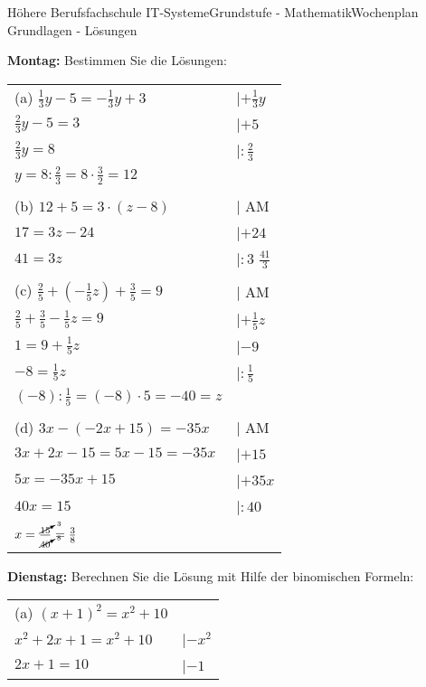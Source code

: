 \documentclass[oneside,openany,headings=optiontotoc,11pt,numbers=noenddot]{scrreprt}
\begin{document}
	\begin{worksheet}{Höhere Berufsfachschule IT-Systeme}{Grundstufe - Mathematik}{Wochenplan Grundlagen - Lösungen}
		\noindent
		\begin{framed}
			\noindent
			\textbf{Montag:} Bestimmen Sie die Lösungen:\\
			\begin{tabularx}{\textwidth}{ll}
				(a) \(\frac{1}{3}y -5 = -\frac{1}{3}y + 3\) & |\(+\frac{1}{3}y\)\\
				\(\frac{2}{3}y-5 = 3\) & |\(+5\)\\
				\(\frac{2}{3}y = 8\) & |\(:\frac{2}{3}\)\\
				\(y = 8:\frac{2}{3} = 8\cdot\frac{3}{2} = 12\)\\
				\\				
				(b) \(12 +5 = 3\cdot{}(z-8)\) & | AM\\
				\(17 = 3z - 24\) & |\(+24\)\\
				\(41 = 3z\) & |\(:3\)
				\(\frac{41}{3}\)\\
				\\
				(c) \(\frac{2}{5}+(-\frac{1}{5}z) + \frac{3}{5} = 9\) & | AM\\
				\(\frac{2}{5}+\frac{3}{5} - \frac{1}{5}z = 9\) & |\(+\frac{1}{5}z\)\\
				\(1 = 9 + \frac{1}{5}z\) & |\(-9\)\\
				\(-8 = \frac{1}{5}z\) & |\(:\frac{1}{5}\)\\
				\((-8):\frac{1}{5} = (-8)\cdot{}5 = -40 = z\)\\
				\\
				(d) \(3x -(-2x+15) = -35x\) & | AM\\
				\(3x +2x -15 = 5x-15 = -35x\) & |\(+15\)\\
				\(5x = -35x +15\) & |\(+35x\)\\
				\(40x = 15\) & |\(:40\)\\
				\(x = \frac{\cancelto{3}{15}}{\cancelto{8}{40}} = \frac{3}{8}\)
			\end{tabularx}
		\end{framed}
		\begin{framed}
			\noindent
			\textbf{Dienstag:} Berechnen Sie die Lösung mit Hilfe der binomischen Formeln:\\
			\begin{tabularx}{\textwidth}{ll}
				(a) \((x+1)^2 = x^2 + 10\)\\
				\(x^2 + 2x + 1 = x^2 +10\) & |\(-x^2\)\\
				\(2x+1 = 10\) & |\(-1\)\\

\end{tabularx}
\end{framed}
\end{worksheet}
\end{document}
